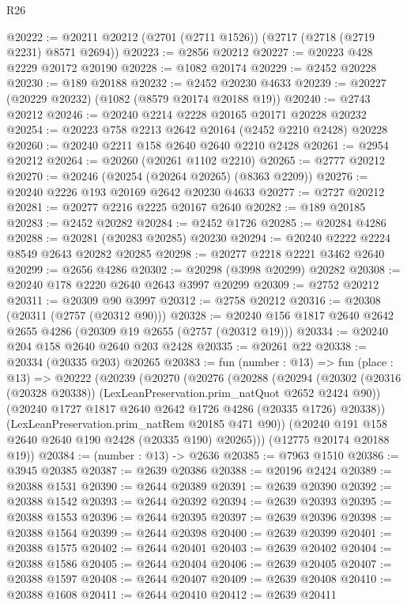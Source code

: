 \begin{lexlean}{R26}
\begin{coremodule}
@20222 := @20211 @20212 (@2701 (@2711 @1526)) (@2717 (@2718 (@2719 @2231) @8571 @2694))
@20223 := @2856 @20212
@20227 := @20223 @428 @2229 @20172 @20190
@20228 := @1082 @20174
@20229 := @2452 @20228
@20230 := @189 @20188
@20232 := @2452 @20230 @4633
@20239 := @20227 (@20229 @20232) (@1082 (@8579 @20174 @20188 @19))
@20240 := @2743 @20212
@20246 := @20240 @2214 @2228 @20165 @20171 @20228 @20232
@20254 := @20223 @758 @2213 @2642 @20164 (@2452 @2210 @2428) @20228
@20260 := @20240 @2211 @158 @2640 @2640 @2210 @2428
@20261 := @2954 @20212
@20264 := @20260 (@20261 @1102 @2210)
@20265 := @2777 @20212
@20270 := @20246 (@20254 (@20264 @20265) (@8363 @2209))
@20276 := @20240 @2226 @193 @20169 @2642 @20230 @4633
@20277 := @2727 @20212
@20281 := @20277 @2216 @2225 @20167 @2640
@20282 := @189 @20185
@20283 := @2452 @20282
@20284 := @2452 @1726
@20285 := @20284 @4286
@20288 := @20281 (@20283 @20285) @20230
@20294 := @20240 @2222 @2224 @8549 @2643 @20282 @20285
@20298 := @20277 @2218 @2221 @3462 @2640
@20299 := @2656 @4286
@20302 := @20298 (@3998 @20299) @20282
@20308 := @20240 @178 @2220 @2640 @2643 @3997 @20299
@20309 := @2752 @20212
@20311 := @20309 @90 @3997
@20312 := @2758 @20212
@20316 := @20308 (@20311 (@2757 (@20312 @90)))
@20328 := @20240 @156 @1817 @2640 @2642 @2655 @4286 (@20309 @19 @2655 (@2757 (@20312 @19)))
@20334 := @20240 @204 @158 @2640 @2640 @203 @2428
@20335 := @20261 @22
@20338 := @20334 (@20335 @203) @20265
@20383 := fun (number : @13) =>
  fun (place : @13) =>
  @20222
    (@20239
      (@20270
        (@20276
          (@20288
            (@20294
              (@20302 (@20316 (@20328 @20338)) (LexLeanPreservation.prim_natQuot @2652 @2424 @90))
              (@20240 @1727 @1817 @2640 @2642 @1726 @4286 (@20335 @1726) @20338))
            (LexLeanPreservation.prim_natRem @20185 @471 @90))
          (@20240 @191 @158 @2640 @2640 @190 @2428 (@20335 @190) @20265)))
      (@12775 @20174 @20188 @19))
@20384 := (number : @13) -> @2636
@20385 := @7963 @1510
@20386 := @3945 @20385
@20387 := @2639 @20386
@20388 := @20196 @2424
@20389 := @20388 @1531
@20390 := @2644 @20389
@20391 := @2639 @20390
@20392 := @20388 @1542
@20393 := @2644 @20392
@20394 := @2639 @20393
@20395 := @20388 @1553
@20396 := @2644 @20395
@20397 := @2639 @20396
@20398 := @20388 @1564
@20399 := @2644 @20398
@20400 := @2639 @20399
@20401 := @20388 @1575
@20402 := @2644 @20401
@20403 := @2639 @20402
@20404 := @20388 @1586
@20405 := @2644 @20404
@20406 := @2639 @20405
@20407 := @20388 @1597
@20408 := @2644 @20407
@20409 := @2639 @20408
@20410 := @20388 @1608
@20411 := @2644 @20410
@20412 := @2639 @20411

\end{coremodule}
\end{lexlean}
